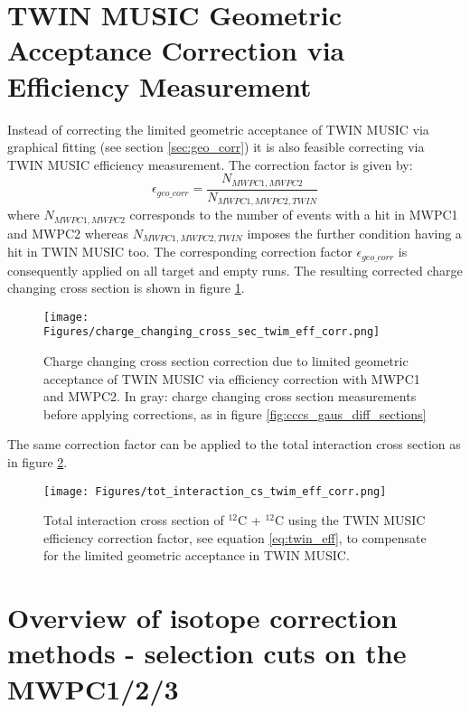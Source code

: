 \begin{appendices}
\section {TWIN MUSIC Geometric Acceptance Correction via Efficiency Measurement}
Instead of correcting the limited geometric acceptance of TWIN MUSIC via graphical fitting (see section \ref{sec:geo_corr}) it is also feasible correcting via TWIN MUSIC efficiency measurement. The correction factor is given by:
\begin{equation}\label{eq:twin_eff}
\epsilon_{geo\text{\_}corr} = \frac{N_{MWPC1,MWPC2}}{N_{MWPC1,MWPC2,TWIN}}
\end{equation}
where $N_{MWPC1,MWPC2}$ corresponds to the number of events with a hit in MWPC1 and MWPC2 whereas $N_{MWPC1,MWPC2,TWIN}$ imposes the further condition having a hit in TWIN MUSIC too.\newline
The corresponding correction factor $\epsilon_{geo\text{\_}corr}$ is consequently applied on all target and empty runs. The resulting corrected charge changing cross section is shown in figure \ref{fig:twim_corr_cc_cs}. 
\begin{figure}[h!]
    \centering
    \texttt{[image: Figures/charge\_changing\_cross\_sec\_twim\_eff\_corr.png]}
    \caption{
        Charge changing cross section correction due to limited geometric acceptance of TWIN MUSIC via efficiency correction with MWPC1 and MWPC2. In gray: charge changing cross section measurements before applying corrections, as in figure \ref{fig:cccs_gaus_diff_sections}}
    \label{fig:twim_corr_cc_cs}
\end{figure}
The same correction factor can be applied to the total interaction cross section as in figure \ref{fig:twim_corr_tot_cs}. 
\begin{figure}[h!]
    \centering
    \texttt{[image: Figures/tot\_interaction\_cs\_twim\_eff\_corr.png]}
    \caption{
        Total interaction cross section of $^{12}$C + $^{12}$C using the TWIN MUSIC efficiency correction factor, see equation \ref{eq:twin_eff}, to compensate for the limited geometric acceptance in TWIN MUSIC.}
    \label{fig:twim_corr_tot_cs}
\end{figure}
\newpage



\section {Overview of isotope correction methods - selection cuts on the MWPC1/2/3}


\end{appendices}
